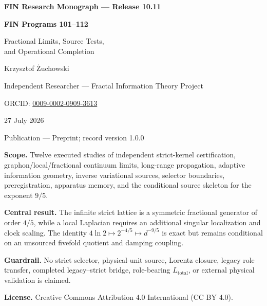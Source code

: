 \documentclass[11pt,a4paper,openany]{report}
\begin{document}
\hypersetup{pageanchor=false}
\begin{titlepage}
\centering
\vspace*{9mm}
{\Large\bfseries FIN Research Monograph --- Release 10.11\par}
\vspace{11mm}
{\Huge\bfseries FIN Programs 101--112\par}
\vspace{6mm}
{\Large Fractional Limits, Source Tests,\\
and Operational Completion\par}
\vspace{17mm}
{\Large Krzysztof \.Zuchowski\par}
\vspace{2mm}
{\normalsize Independent Researcher --- Fractal Information Theory Project\par}
\vspace{2mm}
{\normalsize ORCID: \href{https://orcid.org/0009-0002-0909-3613}{0009-0002-0909-3613}\par}
\vspace{10mm}
{\large 27 July 2026\par}
{\normalsize Publication --- Preprint; record version 1.0.0\par}
\vfill
\begin{minipage}{0.88\textwidth}
\small
\textbf{Scope.} Twelve executed studies of independent strict-kernel
certification, graphon/local/fractional continuum limits, long-range
propagation, adaptive information geometry, inverse variational sources,
selector boundaries, preregistration, apparatus memory, and the conditional
source skeleton for the exponent \(9/5\).

\medskip
\textbf{Central result.} The infinite strict lattice is a symmetric
fractional generator of order \(4/5\), while a local Laplacian requires an
additional singular localization and clock scaling.  The identity
\(4\ln2\mapsto2^{-4/5}\mapsto d^{-9/5}\) is exact but remains conditional on
an unsourced fivefold quotient and damping coupling.

\medskip
\textbf{Guardrail.} No strict selector, physical-unit source, Lorentz closure,
legacy role transfer, completed legacy--strict bridge, role-bearing
\(L_{\mathrm{total}}\), or external physical validation is claimed.

\medskip
\textbf{License.} Creative Commons Attribution 4.0 International (CC BY 4.0).
\end{minipage}
\vfill
\end{titlepage}
\hypersetup{pageanchor=true}
\end{document}
